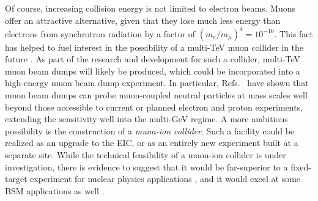 Of course, increasing collision energy is not limited to electron beams. Muons offer an attractive alternative, given that they lose much less energy than electrons from synchrotron radiation by a factor of $(m_e/m_\mu)^4 = 10^{-10}$. This fact has helped to fuel interest in the possibility of a multi-TeV muon collider in the future \cite{Delahaye:2013jla,Long:2020wfp,Accettura:2023ked}. As part of the research and development for such a collider, multi-TeV muon beam dumps will likely be produced, which could be incorporated into a high-energy muon beam dump experiment. In particular, Refs.~\cite{Cesarotti:2022ttv,Cesarotti:2023sje} have shown that muon beam dumps can probe muon-coupled neutral particles at mass scales well beyond those accessible to current or planned electron and proton experiments, extending the sensitivity well into the multi-GeV regime. A more ambitious possibility is the construction of a {\it muon-ion collider}. Such a facility could be realized as an upgrade to the EIC, or as an entirely new experiment built at a separate site. While the technical feasibility of a muon-ion collider is under investigation, there is evidence to suggest that it would be far-superior to a fixed-target experiment for nuclear physics applications \cite{Acosta:2021qpx,Acosta:2022ejc}, and it would excel at some BSM applications as well \cite{Davoudiasl:2024fiz}.

